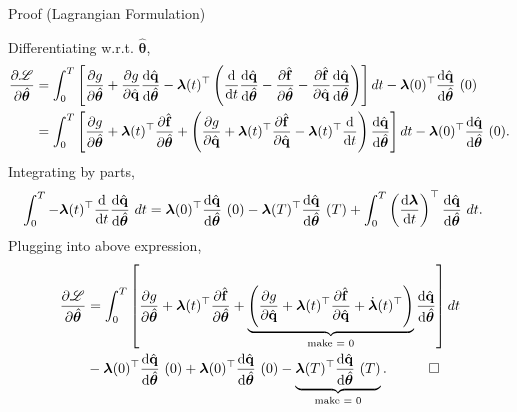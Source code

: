 \begin{frame}{Proof (Lagrangian Formulation)}

{\scriptsize
Differentiating w.r.t. $\hat{\bm{\theta}}$,
\begin{align*}
    \pdv{\mathscr{L}}{\hat{\bm{\theta}}} &= \int_0^T\left[ \pdv{g}{\hat{\bm{\theta}}} + \pdv{g}{\hat{\mathbf{q}}} \dv{\hat{\mathbf{q}}}{\hat{\bm{\theta}}} - \bm{\lambda}(t)^{\top} \left( \dv{t}\dv{\hat{\mathbf{q}}}{\hat{\bm{\theta}}} - \pdv{\hat{\mathbf{f}}}{\hat{\bm{\theta}}} - \pdv{\hat{\mathbf{f}}}{\hat{\mathbf{q}}}\dv{\hat{\mathbf{q}}}{\hat{\bm{\theta}}} \right) \right] dt - \bm{\lambda}(0)^{\top}\dv{\hat{\mathbf{q}}}{\hat{\bm{\theta}}}~(0)\notag\\
    &= \int_0^T \left[\pdv{g}{\hat{\bm{\theta}}} + \bm{\lambda}(t)^{\top} \pdv{\hat{\mathbf{f}}}{\hat{\bm{\theta}}}+ \left( \pdv{g}{\hat{\mathbf{q}}} + \bm{\lambda}(t)^{\top}\pdv{\hat{\mathbf{f}}}{\hat{\mathbf{q}}}-\bm{\lambda}(t)^{\top}\dv{t} \right)\dv{\hat{\mathbf{q}}}{\hat{\bm{\theta}}} \right]dt- \bm{\lambda}(0)^{\top}\dv{\hat{\mathbf{q}}}{\hat{\bm{\theta}}}~(0). 
\end{align*}
Integrating by parts,
\begin{align*}
    \int_0^T -\bm{\lambda}(t)^{\top}\dv{t}\dv{\hat{\mathbf{q}}}{\hat{\bm{\theta}}}~dt &= \bm{\lambda}(0)^{\top}\dv{\hat{\mathbf{q}}}{\hat{\bm{\theta}}}~(0) - \bm{\lambda}(T)^{\top}\dv{\hat{\mathbf{q}}}{\hat{\bm{\theta}}}~(T) + \int_0^T \left( \dv{\bm{\lambda}}{t}\right)^{\top}\dv{\hat{\mathbf{q}}}{\hat{\bm{\theta}}}~dt.
\end{align*}
Plugging into above expression,
\begin{align*}
   \pdv{\mathscr{L}}{\hat{\bm{\theta}}} &= \int_0^T\left[ \pdv{g}{\hat{\bm{\theta}}} + \bm{\lambda}(t)^{\top} \pdv{\hat{\mathbf{f}}}{\hat{\bm{\theta}}} + \underbrace{\left( \pdv{g}{\hat{\mathbf{q}}} + \bm{\lambda}(t)^{\top}\pdv{\hat{\mathbf{f}}}{\hat{\mathbf{q}}}+ \dot{\bm{\lambda}}(t)^{\top}\right)}_{\text{make = 0}} \dv{\hat{\mathbf{q}}}{\hat{\bm{\theta}}} \right]dt \\
   & - \bm{\lambda}(0)^{\top}\dv{\hat{\mathbf{q}}}{\hat{\bm{\theta}}}~(0)+\bm{\lambda}(0)^{\top}\dv{\hat{\mathbf{q}}}{\hat{\bm{\theta}}}~(0) - \underbrace{\bm{\lambda}(T)^{\top}\dv{\hat{\mathbf{q}}}{\hat{\bm{\theta}}}~(T)}_{\text{make = 0}}.\quad\qed
\end{align*}

}

\end{frame}


